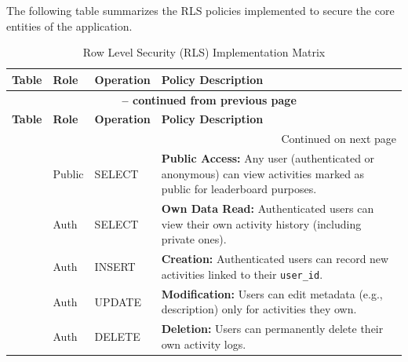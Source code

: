 The following table summarizes the RLS policies implemented to secure the core entities of the application.

\begin{small} %
\renewcommand{\arraystretch}{1.5} %
\begin{longtable}{|p{}|p{}|p{}|p{}|}
\caption{Row Level Security (RLS) Implementation Matrix} \label{tab:rls_policies} \\

\hline
\textbf{Table} & \textbf{Role} & \textbf{Operation} & \textbf{Policy Description} \\ 
\hline
\endfirsthead

\multicolumn{4}{c}{{\bfseries \tablename\ \thetable{} -- continued from previous page}} \\
\hline
\textbf{Table} & \textbf{Role} & \textbf{Operation} & \textbf{Policy Description} \\ 
\hline
\endhead

\hline \multicolumn{4}{|r|}{{Continued on next page}} \\ \hline
\endfoot

\hline
\endlastfoot


\multirow{5}{*}{\textbf{activities}} 
& Public & SELECT & \textbf{Public Access:} Any user (authenticated or anonymous) can view activities marked as public for leaderboard purposes. \\
& Auth & SELECT & \textbf{Own Data Read:} Authenticated users can view their own activity history (including private ones). \\
& Auth & INSERT & \textbf{Creation:} Authenticated users can record new activities linked to their \texttt{user\_id}. \\
& Auth & UPDATE & \textbf{Modification:} Users can edit metadata (e.g., description) only for activities they own. \\
& Auth & DELETE & \textbf{Deletion:} Users can permanently delete their own activity logs. \\ 
\hline


\end{longtable}
\end{small}
